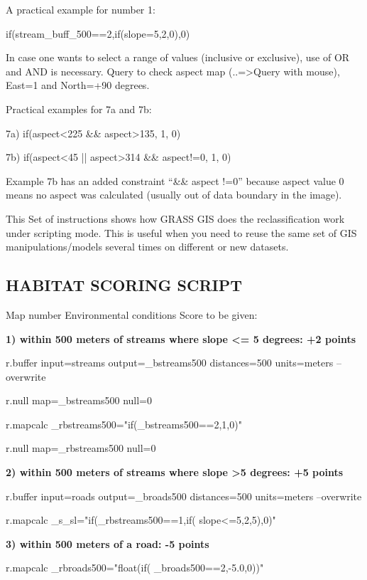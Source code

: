 A practical example for number 1:
\begin{smallverbatim}
if(stream_buff_500==2,if(slope=5,2,0),0)
\end{smallverbatim}
In case one wants to select a range of values (inclusive or exclusive), use of OR and AND is necessary. Query to check aspect map (..=>Query with mouse), East=1 and North=+90 degrees.

Practical examples for 7a and 7b:
\begin{smallverbatim}
7a) if(aspect<225 && aspect>135, 1, 0)

7b) if(aspect<45 || aspect>314 && aspect!=0, 1, 0)
\end{smallverbatim}
Example 7b has an added constraint ``\&\& aspect !=0'' because aspect value 0 means no aspect was calculated (usually out of data boundary in
the image).

This Set of instructions shows how GRASS GIS does the reclassification work under scripting mode. This is useful when you need to reuse the same set of GIS manipulations/models several times on different or new datasets.

\subsection{HABITAT SCORING SCRIPT}

Map number Environmental conditions Score to be given:

\textbf{
1) within 500 meters of streams where slope <= 5 degrees: +2 points}
\begin{smallverbatim}
r.buffer input=streams output=_bstreams500
 distances=500 units=meters --overwrite

r.null map=_bstreams500 null=0

r.mapcalc _rbstreams500="if(_bstreams500==2,1,0)"

r.null map=_rbstreams500 null=0
\end{smallverbatim}

\textbf{
2) within 500 meters of streams where slope >5 degrees: +5 points}
\begin{smallverbatim}
r.buffer input=roads output=_broads500 distances=500
 units=meters --overwrite

r.mapcalc _s_sl="if(_rbstreams500==1,if(
 slope<=5,2,5),0)"
\end{smallverbatim}

\textbf{
3) within 500 meters of a road: -5 points}
\begin{smallverbatim}
r.mapcalc _rbroads500="float(if(
 _broads500==2,-5.0,0))"
\end{smallverbatim}

